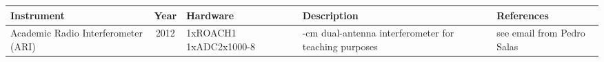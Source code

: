 \documentclass{ws-jai}
\begin{document}
\newcommand{\rr}{\raggedright}
\newcommand{\tn}{\tabularnewline}
\newcommand{\ac}{\centering}
\begin{landscape}
\begin{table}
  \centering
  \begin{tabular}{p{3cm} c p{4cm} p{8cm} p{2cm}}
  \ac Instrument & \ac Year & \ac Hardware & \ac Description & \ac References \tn
  \hline
  Academic Radio Interferometer (ARI) & 2012 & \rr 1xROACH1 1xADC2x1000-8 & \ac 21-cm dual-antenna interferometer for teaching purposes & see email from Pedro Salas \\

\end{tabular}
\end{table}
\end{landscape}
\end{document}
